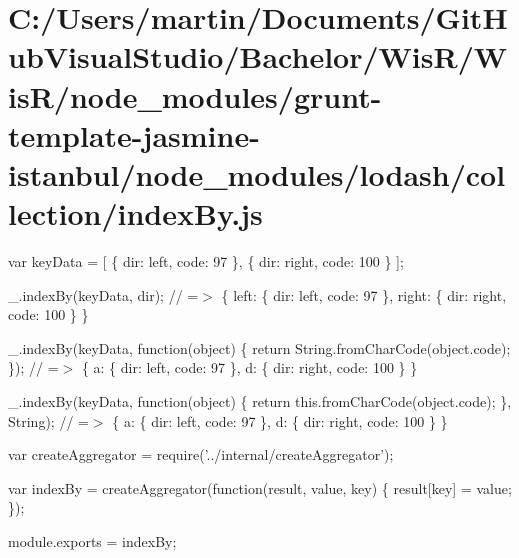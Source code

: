\hypertarget{_c_1_2_users_2martin_2_documents_2_git_hub_visual_studio_2_bachelor_2_wis_r_2_wis_r_2node_module82b56fa66cc5621d63134b5321fbb478}{}\section{C\+:/\+Users/martin/\+Documents/\+Git\+Hub\+Visual\+Studio/\+Bachelor/\+Wis\+R/\+Wis\+R/node\+\_\+modules/grunt-\/template-\/jasmine-\/istanbul/node\+\_\+modules/lodash/collection/index\+By.\+js}
var key\+Data = \mbox{[} \{ \textquotesingle{}dir\textquotesingle{}\+: \textquotesingle{}left\textquotesingle{}, \textquotesingle{}code\textquotesingle{}\+: 97 \}, \{ \textquotesingle{}dir\textquotesingle{}\+: \textquotesingle{}right\textquotesingle{}, \textquotesingle{}code\textquotesingle{}\+: 100 \} \mbox{]};

\+\_\+.\+index\+By(key\+Data, \textquotesingle{}dir\textquotesingle{}); // =$>$ \{ \textquotesingle{}left\textquotesingle{}\+: \{ \textquotesingle{}dir\textquotesingle{}\+: \textquotesingle{}left\textquotesingle{}, \textquotesingle{}code\textquotesingle{}\+: 97 \}, \textquotesingle{}right\textquotesingle{}\+: \{ \textquotesingle{}dir\textquotesingle{}\+: \textquotesingle{}right\textquotesingle{}, \textquotesingle{}code\textquotesingle{}\+: 100 \} \}

\+\_\+.\+index\+By(key\+Data, function(object) \{ return String.\+from\+Char\+Code(object.\+code); \}); // =$>$ \{ \textquotesingle{}a\textquotesingle{}\+: \{ \textquotesingle{}dir\textquotesingle{}\+: \textquotesingle{}left\textquotesingle{}, \textquotesingle{}code\textquotesingle{}\+: 97 \}, \textquotesingle{}d\textquotesingle{}\+: \{ \textquotesingle{}dir\textquotesingle{}\+: \textquotesingle{}right\textquotesingle{}, \textquotesingle{}code\textquotesingle{}\+: 100 \} \}

\+\_\+.\+index\+By(key\+Data, function(object) \{ return this.\+from\+Char\+Code(object.\+code); \}, String); // =$>$ \{ \textquotesingle{}a\textquotesingle{}\+: \{ \textquotesingle{}dir\textquotesingle{}\+: \textquotesingle{}left\textquotesingle{}, \textquotesingle{}code\textquotesingle{}\+: 97 \}, \textquotesingle{}d\textquotesingle{}\+: \{ \textquotesingle{}dir\textquotesingle{}\+: \textquotesingle{}right\textquotesingle{}, \textquotesingle{}code\textquotesingle{}\+: 100 \} \}


\begin{DoxyCodeInclude}
var createAggregator = require(\textcolor{stringliteral}{'../internal/createAggregator'});

var indexBy = createAggregator(\textcolor{keyword}{function}(result, value, key) \{
  result[key] = value;
\});

module.exports = indexBy;
\end{DoxyCodeInclude}
 